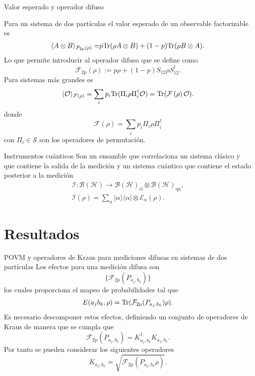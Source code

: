 \documentclass[svgnames,12pt,aspectratio=149]{beamer}
\newcommand{\ra}{\rangle}
\newcommand{\la}{\langle}
\newcommand{\rala}{\rangle\langle}
\newcommand{\tr}{{\rm Tr}}
\newcommand{\E}{\mathcal{E}}
\newcommand{\tensor}{\otimes}
\newcommand{\fuzzy}[1]{\mathcal{F}\left(#1\right)}
\newcommand{\permut}[2]{\Pi_{#1}#2\Pi_{#1}^{\dagger}}
\begin{document}
\begin{frame}{Valor esperado y operador difuso}

 
Para un sistema de dos partículas el valor esperado de un observable factorizable es 
\begin{equation*}\label{eq:Expected-Value-FM-2p}
    \begin{split}
      \la {A\otimes B}\ra_{\mathcal{F}_{2\text{p}}(\rho)} =&p\tr(\rho A\tensor B)+(1-p)\tr(\rho B\otimes A).\\
    \end{split}
\end{equation*}Lo que permite introducir al operador difuso que se define como \begin{equation*}\label{eq:op_F2p}
    \mathcal{F}_{2\text{p}}(\rho):=p\rho + (1-p)S_{12}\rho S_{12}^{\dagger}.
\end{equation*}
Para sistemas más grandes es 
\begin{equation*}\label{eq:expected-value-fm-general}
    \la \mathcal{O}\ra_{\fuzzy{\rho}}=\sum_{i}p_i\tr(\permut{i}{\rho}\mathcal{O}) =\tr(\fuzzy{\rho}\mathcal{O}).
\end{equation*} donde \begin{equation*}\label{eq:fuzzy-op-nparticles}
    \fuzzy{\rho}=\sum_{i}p_{i}\permut{i}{\rho}
 \end{equation*} con $\Pi_i \in \mathcal{S}$ son los operadores de permutación.

\end{frame}

\begin{frame}{Instrumentos cuánticos}
  Son un ensamble que correlaciona un sistema clásico y que contiene la salida de la medición y un sistema cuántico que contiene el estado posterior a la medición \begin{equation*}
    \begin{split}
        \mathcal{I}: \mathcal{B(H)}\rightarrow\mathcal{B(H)}_{\text{cl}}\otimes \mathcal{B(H)}_{\text{qu}},\\
    \mathcal{I}(\rho)=\sum_\alpha |\alpha\rala\alpha|\otimes \E_\alpha(\rho).
    \end{split}
\end{equation*}
\end{frame}


\section{Resultados}
\begin{frame}{POVM y operadores de Kraus para mediciones difusas en sistemas de dos partículas}
  Los efectos para una medición difusa son \[\{\mathcal{F}_{2\text{p}}(P_{a_j,b_k})\}\]los cuales proporciona el mapeo de probabilidades tal que \[   E(a_j b_k, \rho)= \tr(\mathcal{F}_{2\text{p}}({P_{a_j,b_k}})\rho).\] Es necesario descomponer estos efectos, definiendo un conjunto de operadores de Kraus de manera que se cumpla que \[\mathcal{F}_{2\text{p}}(P_{a_j,b_k})=K_{a_j,b_k}^\dagger K_{a_j,b_k}.\] Por tanto se pueden considerar los siguientes operadores \[K_{a_j,b_k}=\sqrt{\mathcal{F}_{2\text{p}}(P_{a_j,b_k}\rho)}.\]
\end{frame}
\end{document}
